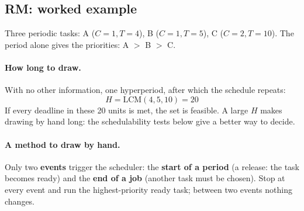 \subsection{RM: worked example}
Three periodic tasks: A ($C = 1, T = 4$), B ($C = 1, T = 5$), C ($C = 2, T = 10$). The period alone gives the priorities: A $>$ B $>$ C.

\paragraph{How long to draw.} With no other information, one hyperperiod, after which the schedule repeats:
\[
H = \mathrm{LCM}(4, 5, 10) = 20
\]
If every deadline in these 20 units is met, the set is feasible. A large $H$ makes drawing by hand long: the schedulability tests below give a better way to decide.

\paragraph{A method to draw by hand.} Only two \textbf{events} trigger the scheduler: the \textbf{start of a period} (a release: the task becomes ready) and the \textbf{end of a job} (another task must be chosen). Stop at every event and run the highest-priority ready task; between two events nothing changes.

